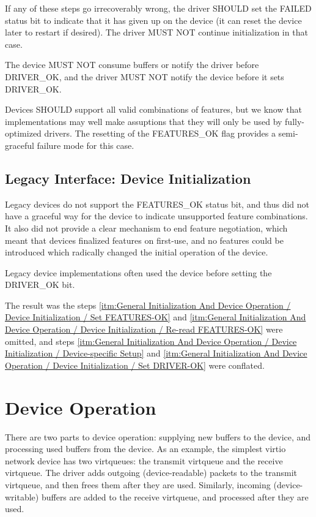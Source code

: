 If any of these steps go irrecoverably wrong, the driver SHOULD
set the FAILED status bit to indicate that it has given up on the
device (it can reset the device later to restart if desired).  The
driver MUST NOT continue initialization in that case.

The device MUST NOT consume buffers or notify the driver before DRIVER_OK, and the driver
MUST NOT notify the device before it sets DRIVER_OK.

Devices SHOULD support all valid combinations of features, but we know
that implementations may well make assuptions that they will only be
used by fully-optimized drivers.  The resetting of the FEATURES_OK flag
provides a semi-graceful failure mode for this case.

\subsection{Legacy Interface: Device Initialization}\label{sec:General Initialization And Device Operation / Device Initialization / Legacy Interface: Device Initialization}
Legacy devices do not support the FEATURES_OK status bit, and thus did
not have a graceful way for the device to indicate unsupported feature
combinations.  It also did not provide a clear mechanism to end
feature negotiation, which meant that devices finalized features on
first-use, and no features could be introduced which radically changed
the initial operation of the device.

Legacy device implementations often used the device before setting the
DRIVER_OK bit.

The result was the steps \ref{itm:General Initialization And Device Operation / Device Initialization / Set FEATURES-OK} and \ref{itm:General Initialization And Device Operation / Device Initialization / Re-read FEATURES-OK} were omitted, and steps \ref{itm:General Initialization And Device Operation / Device Initialization / Device-specific Setup} and \ref{itm:General Initialization And Device Operation / Device Initialization / Set DRIVER-OK}
were conflated.

\section{Device Operation}\label{sec:General Initialization And Device Operation / Device Operation}

There are two parts to device operation: supplying new buffers to
the device, and processing used buffers from the device. As an
example, the simplest virtio network device has two virtqueues: the
transmit virtqueue and the receive virtqueue. The driver adds
outgoing (device-readable) packets to the transmit virtqueue, and then
frees them after they are used. Similarly, incoming (device-writable)
buffers are added to the receive virtqueue, and processed after
they are used.

